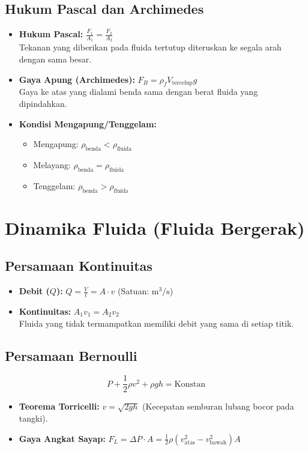 \documentclass{article}
\begin{document}
\subsection{Hukum Pascal dan Archimedes}
\begin{itemize}
    \item \textbf{Hukum Pascal:} $\frac{F_1}{A_1} = \frac{F_2}{A_2}$ \\
    Tekanan yang diberikan pada fluida tertutup diteruskan ke segala arah dengan sama besar.
    \item \textbf{Gaya Apung (Archimedes):} $F_B = \rho_f V_{\text{tercelup}} g$ \\
    Gaya ke atas yang dialami benda sama dengan berat fluida yang dipindahkan.
    \item \textbf{Kondisi Mengapung/Tenggelam:}
    \begin{itemize}
        \item Mengapung: $\rho_{\text{benda}} < \rho_{\text{fluida}}$
        \item Melayang: $\rho_{\text{benda}} = \rho_{\text{fluida}}$
        \item Tenggelam: $\rho_{\text{benda}} > \rho_{\text{fluida}}$
    \end{itemize}
\end{itemize}

\section{Dinamika Fluida (Fluida Bergerak)}

\subsection{Persamaan Kontinuitas}
\begin{itemize}
    \item \textbf{Debit ($Q$):} $Q = \frac{V}{t} = A \cdot v$ (Satuan: $\text{m}^3/\text{s}$)
    \item \textbf{Kontinuitas:} $A_1 v_1 = A_2 v_2$ \\
    Fluida yang tidak termampatkan memiliki debit yang sama di setiap titik.
\end{itemize}

\subsection{Persamaan Bernoulli}
$$P + \frac{1}{2}\rho v^2 + \rho gh = \text{Konstan}$$
\begin{itemize}
    \item \textbf{Teorema Torricelli:} $v = \sqrt{2gh}$ (Kecepatan semburan lubang bocor pada tangki).
    \item \textbf{Gaya Angkat Sayap:} $F_L = \Delta P \cdot A = \frac{1}{2}\rho (v_{\text{atas}}^2 - v_{\text{bawah}}^2) A$
\end{itemize}
\end{document}
